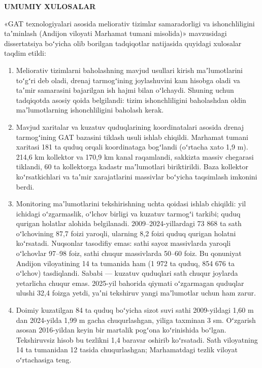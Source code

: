 \documentclass[14pt,a4paper,oneside]{extreport}
\providecommand{\tightlist}{\setlength{\itemsep}{0pt}\setlength{\parskip}{0pt}}
\newcommand{\oakbob}[1]{\clearpage\phantomsection\addcontentsline{toc}{chapter}{#1}%
  \begin{center}\bfseries\MakeUppercase{#1}\end{center}\vspace{6pt}}
\begin{document}
\oakbob{UMUMIY XULOSALAR}

«GAT texnologiyalari asosida meliorativ tizimlar samaradorligi va
ishonchliligini taʼminlash (Andijon viloyati Marhamat tumani misolida)»
mavzusidagi dissertatsiya boʻyicha olib borilgan tadqiqotlar natijasida
quyidagi xulosalar taqdim etildi:

\begin{enumerate}
\def\labelenumi{\arabic{enumi}.}
\tightlist
\item
  Meliorativ tizimlarni baholashning mavjud usullari kirish
  maʼlumotlarini toʻgʻri deb oladi, drenaj tarmogʻining joylashuvini kam
  hisobga oladi va taʼmir samarasini bajarilgan ish hajmi bilan
  oʻlchaydi. Shuning uchun tadqiqotda asosiy qoida belgilandi: tizim
  ishonchliligini baholashdan oldin maʼlumotlarning ishonchliligini
  baholash kerak.
\item
  Mavjud xaritalar va kuzatuv quduqlarining koordinatalari asosida
  drenaj tarmogʻining GAT bazasini tiklash usuli ishlab chiqildi.
  Marhamat tumani xaritasi 181 ta quduq orqali koordinataga bogʻlandi
  (oʻrtacha xato 1,9 m). 214,6 km kollektor va 170,9 km kanal
  raqamlandi, sakkizta massiv chegarasi tiklandi, 60 ta kollektorga
  kadastr maʼlumotlari biriktirildi. Baza kollektor koʻrsatkichlari va
  taʼmir xarajatlarini massivlar boʻyicha taqsimlash imkonini berdi.
\item
  Monitoring maʼlumotlarini tekshirishning uchta qoidasi ishlab
  chiqildi: yil ichidagi oʻzgarmaslik, oʻlchov birligi va kuzatuv
  tarmogʻi tarkibi; quduq qurigan holatlar alohida belgilanadi.
  2009--2024-yillardagi 73 868 ta sath oʻlchovining 87,7 foizi yaroqli,
  ularning 8,2 foizi quduq qurigan holatni koʻrsatadi. Nuqsonlar
  tasodifiy emas: sathi sayoz massivlarda yaroqli oʻlchovlar 97--98
  foiz, sathi chuqur massivlarda 50--60 foiz. Bu qonuniyat Andijon
  viloyatining 14 ta tumanida ham (1 972 ta quduq, 854 676 ta oʻlchov)
  tasdiqlandi. Sababi --- kuzatuv quduqlari sath chuqur joylarda
  yetarlicha chuqur emas. 2025-yil bahorida qiymati oʻzgarmagan quduqlar
  ulushi 32,4 foizga yetdi, yaʼni tekshiruv yangi maʼlumotlar uchun ham
  zarur.
\item
  Doimiy kuzatilgan 84 ta quduq boʻyicha sizot suvi sathi 2009-yildagi
  1,60 m dan 2024-yilda 1,99 m gacha chuqurlashgan, yiliga taxminan 3
  sm. Oʻzgarish asosan 2016-yildan keyin bir martalik pogʻona
  koʻrinishida boʻlgan. Tekshiruvsiz hisob bu tezlikni 1,4 baravar
  oshirib koʻrsatadi. Sath viloyatning 14 ta tumanidan 12 tasida
  chuqurlashgan; Marhamatdagi tezlik viloyat oʻrtachasiga teng.

\end{enumerate}
\end{document}

